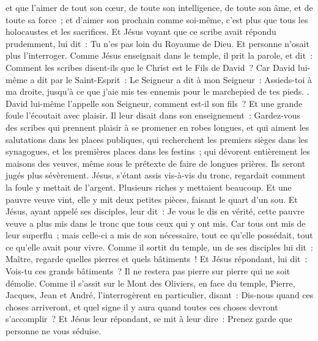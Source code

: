 \begin{multicols}{2}
et que l'aimer de tout son cœur, de toute son intelligence, de toute son âme, et de toute sa force~; et d'aimer son prochain comme soi-même, c'est plus que tous les holocaustes et les sacrifices.
Et Jésus voyant que ce scribe avait répondu prudemment, lui dit~: Tu n'es pas loin du Royaume de Dieu. Et personne n'osait plus l'interroger.
Comme Jésus enseignait dans le temple, il prit la parole, et dit~: Comment les scribes disent-ils que le Christ est le Fils de David~?
Car David lui-même a dit par le Saint-Esprit~: Le Seigneur a dit à mon Seigneur~: Assieds-toi à ma droite, jusqu’à ce que j'aie mis tes ennemis pour le marchepied de tes pieds.
.
David lui-même l'appelle son Seigneur, comment est-il son fils~? Et une grande foule l'écoutait avec plaisir.
Il leur disait dans son enseignement~: Gardez-vous des scribes qui prennent plaisir à se promener en robes longues, et qui aiment les salutations dans les places publiques,
qui recherchent les premiers sièges dans les synagogues, et les premières places dans les festins~;
qui dévorent entièrement les maisons des veuves, même sous le prétexte de faire de longues prières. Ils seront jugés plus sévèrement.
Jésus, s'étant assis vis-à-vis du tronc, regardait comment la foule y mettait de l'argent. Plusieurs riches y mettaient beaucoup.
Et une pauvre veuve vint, elle y mit deux petites pièces, faisant le quart d'un sou.
Et Jésus, ayant appelé ses disciples, leur dit~: Je vous le dis en vérité, cette pauvre veuve a plus mis dans le tronc que tous ceux qui y ont mis.
Car tous ont mis de leur superflu~; mais celle-ci a mis de son nécessaire, tout ce qu'elle possédait, tout ce qu'elle avait pour vivre.
\VerseOne{}Comme il sortit du temple, un de ses disciples lui dit~: Maître, regarde quelles pierres et quels bâtiments~!
Et Jésus répondant, lui dit~: Vois-tu ces grands bâtiments~? Il ne restera pas pierre sur pierre qui ne soit démolie.
Comme il s'assit sur le Mont des Oliviers, en face du temple, Pierre, Jacques, Jean et André, l'interrogèrent en particulier,
disant~: Dis-nous quand ces choses arriveront, et quel signe il y aura quand toutes ces choses devront s'accomplir~?
Et Jésus leur répondant, se mit à leur dire~: Prenez garde que personne ne vous séduise.

\end{multicols}
